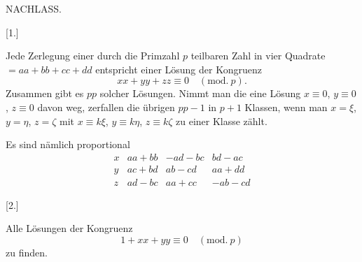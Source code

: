 \begin{center}
{\Large NACHLASS.\par}
\]
\end{center}
\begin{center}[1.]\end{center}
\noindent\hspace*{\parindent}Jede Zerlegung einer durch die Primzahl $p$ teilbaren Zahl in vier Quadrate $=aa+bb+cc+dd$ entspricht einer Lösung der Kongruenz
\[
xx+yy+zz\equiv 0\quad(\mathrm{mod.}\ p).
\]
\noindent Zusammen gibt es $pp$ solcher Lösungen. Nimmt man die eine Lösung $x\equiv0$, $y\equiv0$, $z\equiv0$ davon weg, zerfallen die übrigen $pp-1$ in $p+1$ Klassen, wenn man $x=\xi$, $y=\eta$, $z=\zeta$ mit $x\equiv k\xi$, $y\equiv k\eta$, $z\equiv k\zeta$ zu einer Klasse zählt.

Es sind nämlich proportional
\[
\begin{array}{c|c|c|c}
x & aa+bb & -ad-bc & bd-ac\\
y & ac+bd & ab-cd & aa+dd\\
z & ad-bc & aa+cc & -ab-cd
\end{array}
\]
\begin{center}[2.]\end{center}
\noindent\hspace*{\parindent}Alle Lösungen der Kongruenz
\[
1+xx+yy\equiv0\quad(\mathrm{mod.}\ p)
\]
\noindent zu finden.
\clearpage
